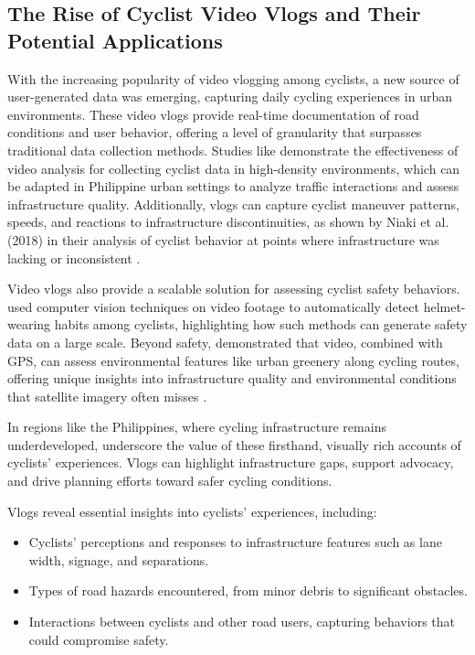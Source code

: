 \subsection{The Rise of Cyclist Video Vlogs and Their Potential Applications}

With the increasing popularity of video vlogging among cyclists, a new source of user-generated data was emerging, capturing daily cycling experiences in urban environments. These video vlogs provide real-time documentation of road conditions and user behavior, offering a level of granularity that surpasses traditional data collection methods. Studies like \citet{Zaki:2016} demonstrate the effectiveness of video analysis for collecting cyclist data in high-density environments, which can be adapted in Philippine urban settings to analyze traffic interactions and assess infrastructure quality. Additionally, vlogs can capture cyclist maneuver patterns, speeds, and reactions to infrastructure discontinuities, as shown by Niaki et al. (2018) in their analysis of cyclist behavior at points where infrastructure was lacking or inconsistent \citep{Zaki:2016, Niaki:2018}.

Video vlogs also provide a scalable solution for assessing cyclist safety behaviors. \citet{Li:2014} used computer vision techniques on video footage to automatically detect helmet-wearing habits among cyclists, highlighting how such methods can generate safety data on a large scale. Beyond safety, \citet{Bourassa:2023} demonstrated that video, combined with GPS, can assess environmental features like urban greenery along cycling routes, offering unique insights into infrastructure quality and environmental conditions that satellite imagery often misses \citet{Li:2014, Bourassa:2023}. 

In regions like the Philippines, where cycling infrastructure remains underdeveloped, \citet{Bakker:2018} underscore the value of these firsthand, visually rich accounts of cyclists' experiences. Vlogs can highlight infrastructure gaps, support advocacy, and drive planning efforts toward safer cycling conditions.

Vlogs reveal essential insights into cyclists' experiences, including:
\begin{itemize}
    \item Cyclists' perceptions and responses to infrastructure features such as lane width, signage, and separations.
    \item Types of road hazards encountered, from minor debris to significant obstacles.
    \item Interactions between cyclists and other road users, capturing behaviors that could compromise safety.
\end{itemize}



